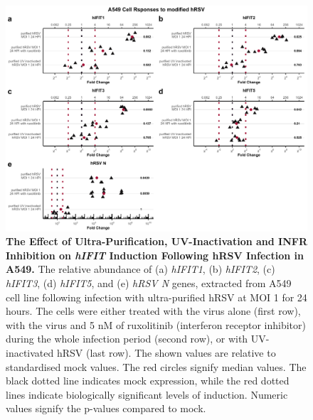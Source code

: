 \begin{figure}
    \centering
    \includegraphics[width=1\linewidth]{06. Chapter 1/Figs/01. Induction/06. a549_hrsv_uv_roxo.pdf}
    \caption[The Effect of Ultra-Purification, UV-Inactivation and INFR Inhibition on \textit{hIFIT} Induction Following hRSV Infection in A549.]{\textbf{The Effect of Ultra-Purification, UV-Inactivation and INFR Inhibition on \textit{hIFIT} Induction Following hRSV Infection in A549.} The relative abundance of (a) \textit{hIFIT1}, (b) \textit{hIFIT2}, (c) \textit{hIFIT3}, (d) \textit{hIFIT5}, and (e) \textit{hRSV N} genes, extracted from A549 cell line following infection with ultra-purified hRSV at MOI 1 for 24 hours. The cells were either treated with the virus alone (first row), with the virus and 5 nM of ruxolitinib (interferon receptor inhibitor) during the whole infection period (second row), or with UV-inactivated hRSV (last row). The shown values are relative to standardised mock values. The red circles signify median values. The black dotted line indicates mock expression, while the red dotted lines indicate biologically significant levels of induction. Numeric values signify the p-values compared to mock.}
    \label{fig:The effect of ultra-purification, UV-inactivation and INFR inhibition on hIFIT induction following hRSV infection in A549}
\end{figure}


